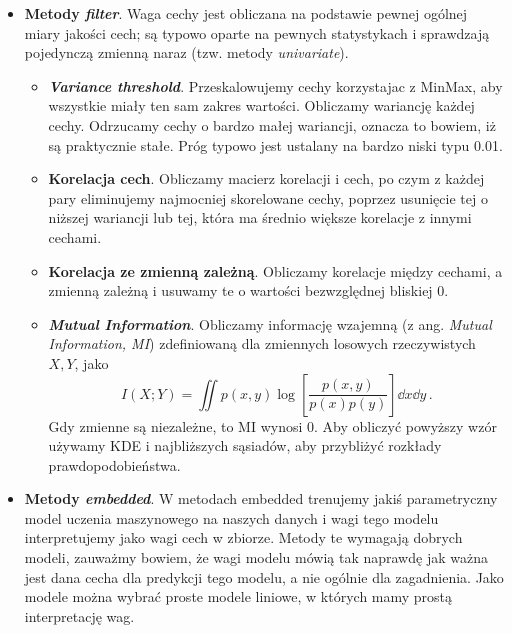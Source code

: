 \documentclass{myclass}
\numberwithin{equation}{subsection}
\begin{document}
\begin{itemize}
    
    \item \textbf{Metody \textit{filter}}. Waga cechy jest obliczana na podstawie pewnej ogólnej
    miary jakości cech; są typowo oparte na pewnych statystykach i sprawdzają pojedynczą zmienną
    naraz (tzw. metody \textit{univariate}).
    
    \begin{itemize}

        \item \textbf{\textit{Variance threshold}}. Przeskalowujemy cechy korzystajac z MinMax, aby
        wszystkie miały ten sam zakres wartości. Obliczamy wariancję każdej cechy. Odrzucamy cechy o
        bardzo małej wariancji, oznacza to bowiem, iż są praktycznie stałe. Próg typowo jest
        ustalany na bardzo niski typu 0.01.

        \item \textbf{Korelacja cech}. Obliczamy macierz korelacji i cech, po czym z każdej pary
        eliminujemy najmocniej skorelowane cechy, poprzez usunięcie tej o niższej wariancji lub tej,
        która ma średnio większe korelacje z innymi cechami.

        \item \textbf{Korelacja ze zmienną zależną}. Obliczamy korelacje między cechami, a zmienną
        zależną i usuwamy te o wartości bezwzględnej bliskiej 0. 

        \item \textbf{\textit{Mutual Information}}. Obliczamy informację wzajemną (z ang.
        \textit{Mutual Information, MI}) zdefiniowaną dla zmiennych losowych rzeczywistych \(X, Y\),
        jako
        \begin{equation}
            I(X; Y) = \iint p(x, y) \log\left[\frac{p(x,y)}{p(x)p(y)}\right] \dd{x}\dd{y}\,.
        \end{equation}
        Gdy zmienne są niezależne, to MI wynosi 0. Aby obliczyć powyższy wzór używamy KDE i
        najbliższych sąsiadów, aby przybliżyć rozkłady prawdopodobieństwa.

    \end{itemize}

    \item \textbf{Metody \textit{embedded}}. W metodach embedded trenujemy jakiś parametryczny model
    uczenia maszynowego na naszych danych i wagi tego modelu interpretujemy jako wagi cech w
    zbiorze. Metody te wymagają dobrych modeli, zauważmy bowiem, że wagi modelu mówią tak naprawdę
    jak ważna jest dana cecha dla predykcji tego modelu, a nie ogólnie dla zagadnienia. Jako modele
    można wybrać proste modele liniowe, w których mamy prostą interpretację wag.

\end{itemize}
\end{document}
